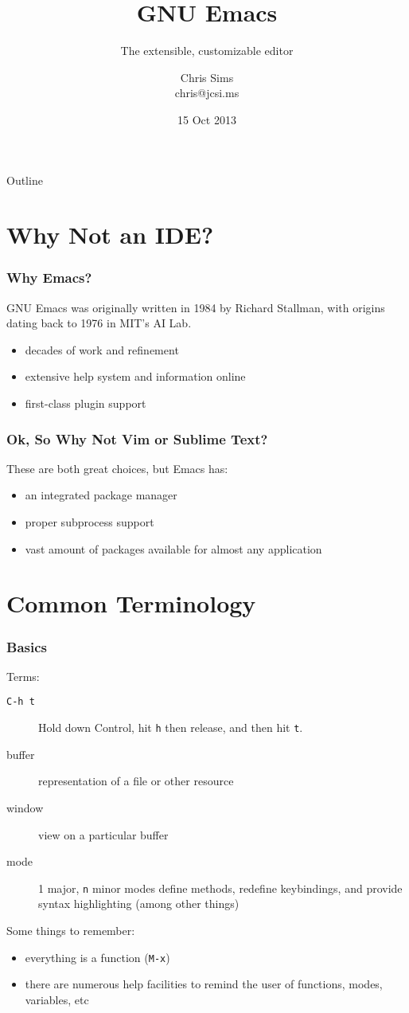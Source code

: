 \documentclass{beamer}
\title{GNU Emacs}
\subtitle{The extensible, customizable editor}
\author{Chris Sims \\ chris@jcsi.ms}
\date{15 Oct 2013}
\begin{document}
\lstset{language=[LaTeX]TeX}
\frame{\titlepage}

\begin{frame}{Outline}
  \tableofcontents
\end{frame}


\section{Why Not an IDE?}
\begin{frame}
  \frametitle{Why Emacs?}  GNU Emacs was originally written in 1984 by
  Richard Stallman, with origins dating back to 1976 in MIT's AI Lab.
  \begin{itemize}
  \item decades of work and refinement
  \item extensive help system and information online
  \item first-class plugin support
  \end{itemize}
\end{frame}

\begin{frame}
  \frametitle{Ok, So Why Not Vim or Sublime Text?}

  These are both great choices, but Emacs has:
  \begin{itemize}
  \item an integrated package manager
  \item proper subprocess support
  \item vast amount of packages available for almost any application
  \end{itemize}

\end{frame}

\section{Common Terminology}
\begin{frame}
  \frametitle{Basics}
  Terms:
  \begin{description}
  \item[\texttt{C-h t}] Hold down Control, hit {\tt h} then release, and then
    hit {\tt t}.
  \item[buffer] representation of a file or other resource
  \item[window] view on a particular buffer
  \item[mode] 1 major, {\tt n} minor modes define methods,
    redefine keybindings, and provide syntax highlighting (among
    other things)
  \end{description}
  Some things to remember:
  \begin{itemize}
  \item everything is a function ({\tt M-x})
  \item there are numerous help facilities to remind the user of functions,
    modes, variables, etc
  \end{itemize}
\end{frame}
\end{document}
